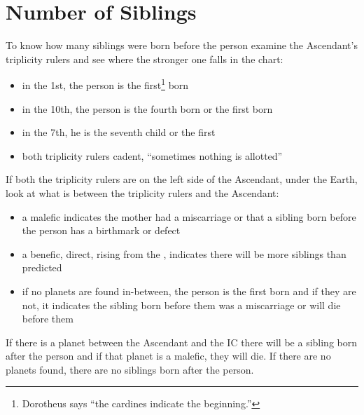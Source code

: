 \section{Number of Siblings}

To know how many siblings were born before the person examine the Ascendant's triplicity rulers and see where the stronger one falls in the chart:
\begin{itemize}[topsep=0em, itemsep=0em]
\item in the 1st, the person is the first\footnote{Dorotheus says ``the cardines indicate the beginning.''} born
\item in the 10th, the person is the fourth born or the first born
\item in the 7th, he is the seventh child or the first
\item both triplicity rulers cadent, ``sometimes nothing is allotted''
\end{itemize}

If both the triplicity rulers are on the left side of the Ascendant, under the Earth, look at what is between the triplicity rulers and the Ascendant:
\begin{itemize}
\item a malefic indicates the mother had a miscarriage or that a sibling born before the person has a birthmark or defect
\item a benefic, direct, rising from the \Sun, indicates there will be more siblings than predicted
\item if no planets are found in-between, the person is the first born and if they are not, it indicates the sibling born before them was a miscarriage or will die before them
\end{itemize}

If there is a planet between the Ascendant and the IC there will be a sibling born after the person and if that planet is a malefic, they will die. If there are no planets found, there are no siblings born after the person.